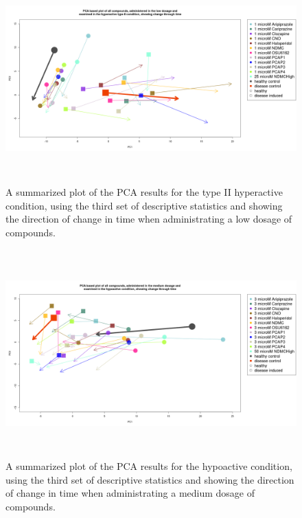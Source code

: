 \documentclass[a4paper,12pt]{article}
\begin{document}
\newpage
\begin{figure}[h!]
\begin{center}
\includegraphics[width=16cm,height=8cm]{All_together_1_microM_DarkPTZ_in_time_set3_NM.png}
\caption{A summarized plot of the PCA results for the type II hyperactive condition, using the third set of descriptive statistics and showing the direction of change in time when administrating a low dosage of compounds.}
\end{center}
\end{figure}
\newpage
\begin{figure}[h!]
\begin{center}
\includegraphics[width=16cm,height=8cm]{All_together_3_microM_DarkApoLow_in_time_set3.png}
\caption{A summarized plot of the PCA results for the hypoactive condition, using the third set of descriptive statistics and showing the direction of change in time when administrating a medium dosage of compounds.}
\end{center}
\end{figure}
\end{document}
